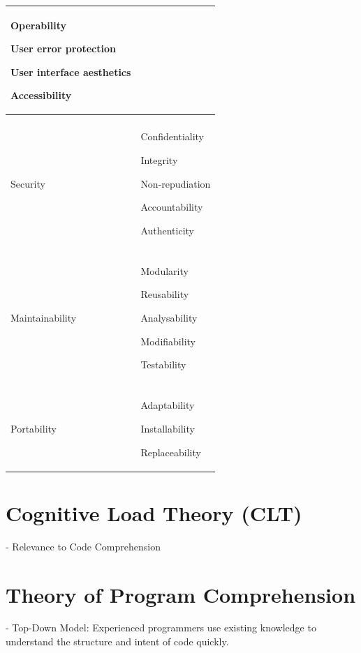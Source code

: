 \begin{table}[h!]
\begin{tabularx}{\textwidth}{X | X }
       Operability
       
       User error protection
       
       User interface aesthetics

       Accessibility
       
      
	    \\ \hline
	    \\ %
	    
	   Security	
       
       & Confidentiality
       
       Integrity
       
       Non-repudiation
       
       Accountability
       
       Authenticity
              
       
	    \\ \hline
	    \\ %
	    
	   Maintainability	
       
       &  Modularity
       
       Reusability
       
       Analysability
       
       Modifiability
       
       Testability
     
	    \\ \hline
	    \\ %
	    
	   Portability	
       
       & Adaptability
       
       Installability
       
       Replaceability
        	   
	\end{tabularx}
	\label{tab:table1}
	
\end{table}

\section{Cognitive Load Theory (CLT)}
- Relevance to Code Comprehension

\section{Theory of Program Comprehension}
- Top-Down Model: Experienced programmers use existing knowledge to understand the structure and intent of code quickly.

